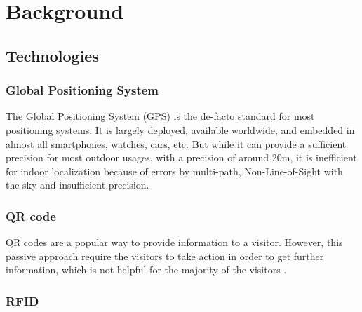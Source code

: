 \chapter{Background}

\section{Technologies}



\subsection{Global Positioning System}

The Global Positioning System (GPS) is the de-facto standard for most positioning systems. It is largely deployed, available worldwide, and embedded in almost all smartphones, watches, cars, etc. But while it can provide a sufficient precision for most outdoor usages, with a precision of around 20m, it is inefficient for indoor localization because of errors by multi-path, Non-Line-of-Sight with the sky \cite{mainetti_survey_2014} and insufficient precision.


\subsection{QR code}

QR codes are a popular way to provide information to a visitor. However, this passive approach require the visitors to take action in order to get further information, which is not helpful for the majority of the visitors \cite{spachos_ble_2020}. 

\subsection{RFID}

